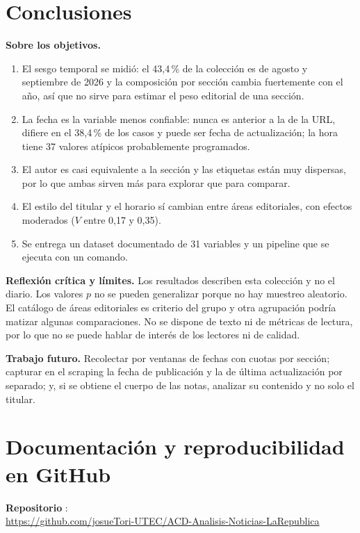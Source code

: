 \documentclass[12pt,a4paper]{article}
\begin{document}
\section{Conclusiones}
\textbf{Sobre los objetivos.}
\begin{enumerate}
\item El sesgo temporal se midió: el 43,4\,\% de la colección es de agosto y septiembre de 2026 y la composición por sección cambia fuertemente con el año, así que no sirve para estimar el peso editorial de una sección.
\item La fecha es la variable menos confiable: nunca es anterior a la de la URL, difiere en el 38,4\,\% de los casos y puede ser fecha de actualización; la hora tiene 37 valores atípicos probablemente programados.
\item El autor es casi equivalente a la sección y las etiquetas están muy dispersas, por lo que ambas sirven más para explorar que para comparar.
\item El estilo del titular y el horario sí cambian entre áreas editoriales, con efectos moderados ($V$ entre 0,17 y 0,35).
\item Se entrega un dataset documentado de 31 variables y un pipeline que se ejecuta con un comando.
\end{enumerate}

\textbf{Reflexión crítica y límites.} Los resultados describen esta colección y no el diario. Los valores $p$ no se pueden generalizar porque no hay muestreo aleatorio. El catálogo de áreas editoriales es criterio del grupo y otra agrupación podría matizar algunas comparaciones. No se dispone de texto ni de métricas de lectura, por lo que no se puede hablar de interés de los lectores ni de calidad.

\textbf{Trabajo futuro.} Recolectar por ventanas de fechas con cuotas por sección; capturar en el scraping la fecha de publicación y la de última actualización por separado; y, si se obtiene el cuerpo de las notas, analizar su contenido y no solo el titular.

\section{Documentación y reproducibilidad en GitHub}
\textbf{Repositorio} \cite{repo}:\\
\url{https://github.com/josueTori-UTEC/ACD-Analisis-Noticias-LaRepublica}
\end{document}
